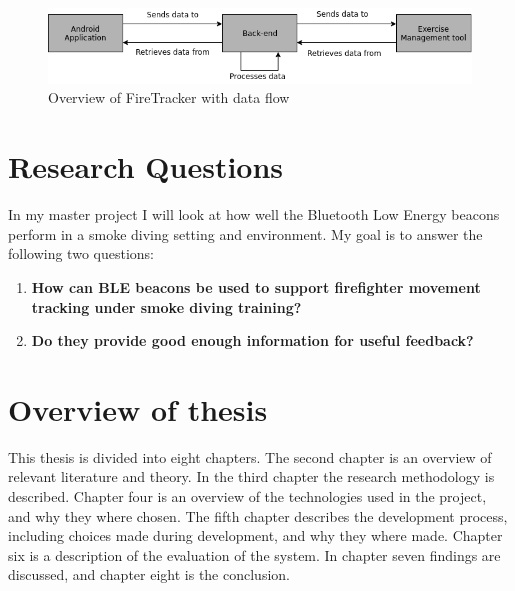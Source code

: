 \documentclass[../Main/thesis.tex]{subfiles}
\begin{document}
\begin{figure}[h]
	\centering
	\includegraphics[width=\textwidth]{../fig/system-overview}
	\caption{Overview of FireTracker with data flow}
	\label{fig:system-overview}
\end{figure}

\section{Research Questions}
\label{ch:reserch_questions}
In my master project I will look at how well the Bluetooth Low Energy beacons perform in a smoke diving setting and environment. 
My goal is to answer the following two questions:

\begin{enumerate}
	\item \textbf{How can BLE beacons be used to support firefighter movement tracking under smoke diving training?}
	\item \textbf{Do they provide good enough information for useful feedback?}
\end{enumerate}


\section{Overview of thesis}
This thesis is divided into eight chapters.
The second chapter is an overview of relevant literature and theory.
In the third chapter the research methodology is described.
Chapter four is an overview of the technologies used in the project, and why they where chosen.
The fifth chapter describes the development process, including choices made during development, and why they where made. 
Chapter six is a description of the evaluation of the system.
In chapter seven findings are discussed, and chapter eight is the conclusion.


\blankpage

\onlyinsubfile{}
\onlyinsubfile{}
\end{document}
